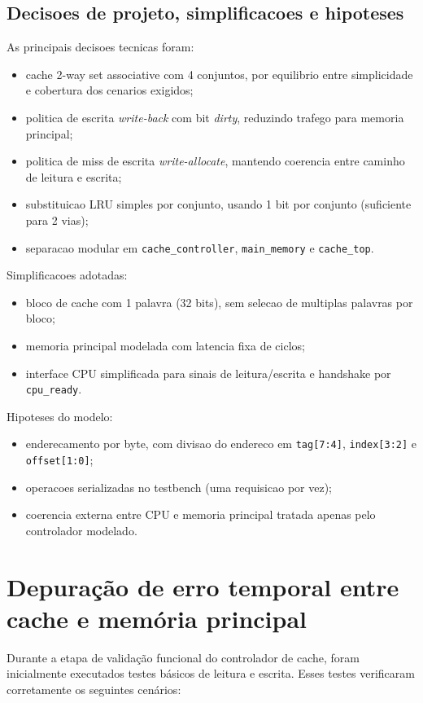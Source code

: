 ﻿\documentclass[12pt,a4paper]{article}
\begin{document}
\subsection{Decisoes de projeto, simplificacoes e hipoteses}
As principais decisoes tecnicas foram:
\begin{itemize}
    \item cache 2-way set associative com 4 conjuntos, por equilibrio entre simplicidade e cobertura dos cenarios exigidos;
    \item politica de escrita \textit{write-back} com bit \textit{dirty}, reduzindo trafego para memoria principal;
    \item politica de miss de escrita \textit{write-allocate}, mantendo coerencia entre caminho de leitura e escrita;
    \item substituicao LRU simples por conjunto, usando 1 bit por conjunto (suficiente para 2 vias);
    \item separacao modular em \texttt{cache\_controller}, \texttt{main\_memory} e \texttt{cache\_top}.
\end{itemize}

Simplificacoes adotadas:
\begin{itemize}
    \item bloco de cache com 1 palavra (32 bits), sem selecao de multiplas palavras por bloco;
    \item memoria principal modelada com latencia fixa de ciclos;
    \item interface CPU simplificada para sinais de leitura/escrita e handshake por \texttt{cpu\_ready}.
\end{itemize}

Hipoteses do modelo:
\begin{itemize}
    \item enderecamento por byte, com divisao do endereco em \texttt{tag[7:4]}, \texttt{index[3:2]} e \texttt{offset[1:0]};
    \item operacoes serializadas no testbench (uma requisicao por vez);
    \item coerencia externa entre CPU e memoria principal tratada apenas pelo controlador modelado.
\end{itemize}
\section{Depuração de erro temporal entre cache e memória principal}

Durante a etapa de validação funcional do controlador de cache, foram inicialmente executados testes básicos de leitura e escrita. Esses testes verificaram corretamente os seguintes cenários:
\end{document}
